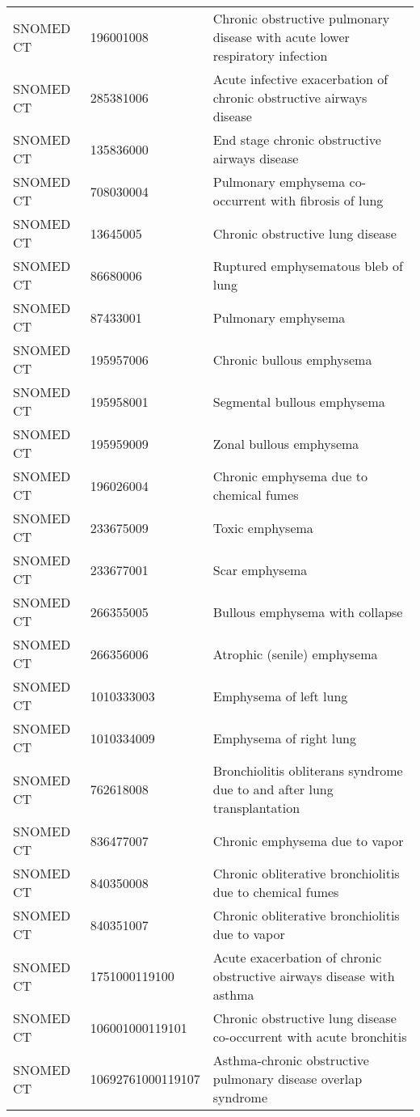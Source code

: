 \begin{longtable}{p{}p{}p{}}
  SNOMED CT & 196001008 & Chronic obstructive pulmonary disease with acute lower respiratory infection \\ 
  SNOMED CT & 285381006 & Acute infective exacerbation of chronic obstructive airways disease \\ 
  SNOMED CT & 135836000 & End stage chronic obstructive airways disease \\ 
  SNOMED CT & 708030004 & Pulmonary emphysema co-occurrent with fibrosis of lung \\ 
  SNOMED CT & 13645005 & Chronic obstructive lung disease \\ 
  SNOMED CT & 86680006 & Ruptured emphysematous bleb of lung \\ 
  SNOMED CT & 87433001 & Pulmonary emphysema \\ 
  SNOMED CT & 195957006 & Chronic bullous emphysema \\ 
  SNOMED CT & 195958001 & Segmental bullous emphysema \\ 
  SNOMED CT & 195959009 & Zonal bullous emphysema \\ 
  SNOMED CT & 196026004 & Chronic emphysema due to chemical fumes \\ 
  SNOMED CT & 233675009 & Toxic emphysema \\ 
  SNOMED CT & 233677001 & Scar emphysema \\ 
  SNOMED CT & 266355005 & Bullous emphysema with collapse \\ 
  SNOMED CT & 266356006 & Atrophic (senile) emphysema \\ 
  SNOMED CT & 1010333003 & Emphysema of left lung \\ 
  SNOMED CT & 1010334009 & Emphysema of right lung \\ 
  SNOMED CT & 762618008 & Bronchiolitis obliterans syndrome due to and after lung transplantation \\ 
  SNOMED CT & 836477007 & Chronic emphysema due to vapor \\ 
  SNOMED CT & 840350008 & Chronic obliterative bronchiolitis due to chemical fumes \\ 
  SNOMED CT & 840351007 & Chronic obliterative bronchiolitis due to vapor \\ 
  SNOMED CT & 1751000119100 & Acute exacerbation of chronic obstructive airways disease with asthma \\ 
  SNOMED CT & 106001000119101 & Chronic obstructive lung disease co-occurrent with acute bronchitis \\ 
  SNOMED CT & 10692761000119107 & Asthma-chronic obstructive pulmonary disease overlap syndrome \\ 

\end{longtable}

